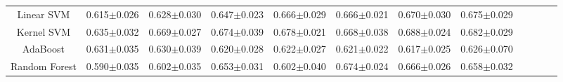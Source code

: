 \documentclass{article}
\theoremstyle{plain}
\begin{document}
\begin{table*}
\begin{center}
{\begin{tabular}{*{12}{c}}
\cmidrule(lr){1-1}
\cmidrule(lr){2-2}
\cmidrule(lr){3-3}
\cmidrule(lr){4-4}
\cmidrule(lr){5-5}
\cmidrule(lr){6-6}
\cmidrule(lr){7-7}
\cmidrule(lr){8-8}
Linear SVM&0.615$\pm$0.026&0.628$\pm$0.030&0.647$\pm$0.023&0.666$\pm$0.029&0.666$\pm$0.021&0.670$\pm$0.030&0.675$\pm$0.029\\


\cmidrule(lr){1-1}
\cmidrule(lr){2-2}
\cmidrule(lr){3-3}
\cmidrule(lr){4-4}
\cmidrule(lr){5-5}
\cmidrule(lr){6-6}
\cmidrule(lr){7-7}
\cmidrule(lr){8-8}
Kernel SVM&0.635$\pm$0.032&0.669$\pm$0.027&0.674$\pm$0.039&0.678$\pm$0.021&0.668$\pm$0.038&0.688$\pm$0.024&0.682$\pm$0.029\\


\cmidrule(lr){1-1}
\cmidrule(lr){2-2}
\cmidrule(lr){3-3}
\cmidrule(lr){4-4}
\cmidrule(lr){5-5}
\cmidrule(lr){6-6}
\cmidrule(lr){7-7}
\cmidrule(lr){8-8}
AdaBoost&0.631$\pm$0.035&0.630$\pm$0.039&0.620$\pm$0.028&0.622$\pm$0.027&0.621$\pm$0.022&0.617$\pm$0.025&0.626$\pm$0.070\\



\cmidrule(lr){1-1}
\cmidrule(lr){2-2}
\cmidrule(lr){3-3}
\cmidrule(lr){4-4}
\cmidrule(lr){5-5}
\cmidrule(lr){6-6}
\cmidrule(lr){7-7}
\cmidrule(lr){8-8}
Random Forest&0.590$\pm$0.035&0.602$\pm$0.035&0.653$\pm$0.031&0.602$\pm$0.040&0.674$\pm$0.024&0.666$\pm$0.026&0.658$\pm$0.032\\



\bottomrule

\end{tabular}
}
\end{center}
\label{tab:main-result}
\end{table*}
\end{document}
